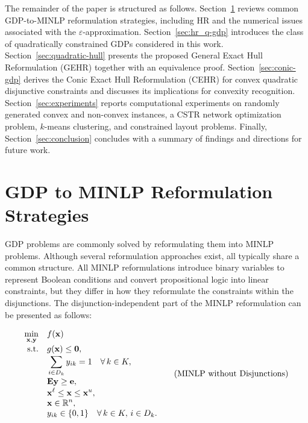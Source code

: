 \documentclass[11pt]{article}
\begin{document}
The remainder of the paper is structured as follows.
Section~\ref{sec:gdp-strategies} reviews common GDP-to-MINLP reformulation strategies, including HR and the numerical issues associated with the $\varepsilon$-approximation.
Section~\ref{sec:hr_q-gdp} introduces the class of quadratically constrained GDPs considered in this work. 
Section~\ref{sec:quadratic-hull} presents the proposed General Exact Hull Reformulation (GEHR) together with an equivalence proof.
Section~\ref{sec:conic-gdp} derives the Conic Exact Hull Reformulation (CEHR) for convex quadratic disjunctive constraints and discusses its implications for convexity recognition.
Section~\ref{sec:experiments} reports computational experiments on randomly generated convex and non-convex instances, a CSTR network optimization problem, $k$-means clustering, and constrained layout problems.
Finally, Section~\ref{sec:conclusion} concludes with a summary of findings and directions for future work.






\section{GDP to MINLP Reformulation Strategies}
\label{sec:gdp-strategies}


GDP problems are commonly solved by reformulating them into MINLP problems.
Although several reformulation approaches exist, all typically share a common structure.
All MINLP reformulations introduce binary variables to represent Boolean conditions and convert propositional logic into linear constraints, but they differ in how they reformulate the constraints within the disjunctions.
The disjunction-independent part of the MINLP reformulation can be presented as follows:

\begingroup
\begin{equation}
\setlength{\jot}{0pt} 
\begin{aligned}
    \min_{\mathbf{x}, \mathbf{y}} \quad 
    & f(\mathbf{x}) \\
    \text{s.t.} \quad 
    & g(\mathbf{x}) \leq\mathbf{0}, \\%
    & \sum_{i \in D_k} y_{ik} = 1 
        \quad \forall\, k \in K,\\
    & \mathbf{E} \mathbf{y} \geq \mathbf{e}, \\
    & \mathbf{x}^{\ell} \leq \mathbf{x} \leq \mathbf{x}^{u}, \\
    & \mathbf{x} \in \mathbb{R}^n, \\
    & y_{ik} \in \{0, 1\}
        \quad \forall\, k \in K,\, i \in D_k.
\end{aligned}
\qquad \text{(MINLP without Disjunctions)}
\label{eq:MINLP}
\end{equation}
\endgroup
\end{document}
